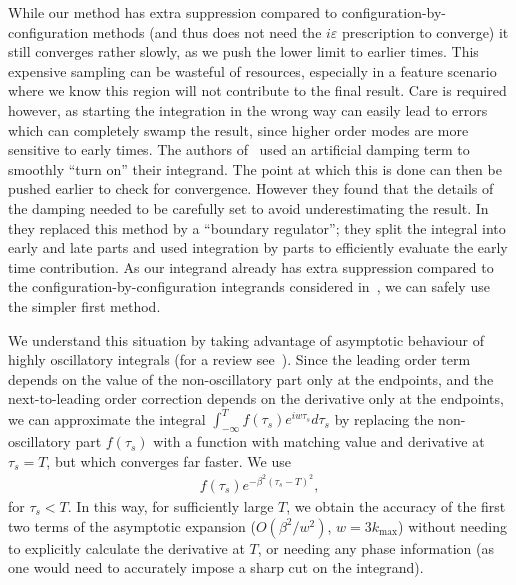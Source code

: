 \documentclass[a4paper,12pt]{extarticle}
\newcommand{\kmax}{{k_\text{max}}}
\begin{document}
While our method has extra suppression compared to configuration-by-configuration methods
(and thus does not need the $i\varepsilon$ prescription to converge)
it still converges rather slowly, as we push the lower limit to earlier times.
This expensive sampling can be wasteful of resources,
especially in a feature scenario where we know this
region will not contribute to the final result.
Care is required however, as starting the integration in the wrong way can easily lead to
errors which can completely swamp the result, since higher order modes
are more sensitive to early times.
The authors of~\cite{chen_easther_lim_1} used an artificial damping term to smoothly
``turn on'' their integrand.
The point at which this is done can then be pushed earlier to check for convergence.
However they found that the details of the damping needed to
be carefully set to avoid underestimating the result.
In~\cite{chen_easther_lim_2} they replaced this method by a ``boundary regulator'';
they split the integral into early and late parts and used integration by parts to
efficiently evaluate the early time contribution.
As our integrand already has extra suppression compared to the configuration-by-configuration
integrands considered in~\cite{chen_easther_lim_1,chen_easther_lim_2},
we can safely use the simpler first method.


We understand this situation by
taking advantage of asymptotic behaviour of highly oscillatory
integrals (for a review see~\cite{iserles_2005}).
Since the leading order term depends on
the value of the non-oscillatory part only at the endpoints,
and the next-to-leading order correction depends on the
derivative only at the endpoints, we can approximate the integral
$\int_{-\infty}^T f(\tau_s)e^{iw\tau_s}d\tau_s$
by replacing the non-oscillatory part $f(\tau_s)$ with a function with
matching value and derivative at $\tau_s=T$,
but which converges far faster.
We use
\begin{align}\label{smooth_cutoff}
f(\tau_s)e^{-\beta^2(\tau_s-T)^2},
\end{align}
for $\tau_s<T$.
In this way, for sufficiently large $T$,
we obtain the accuracy of the
first two terms of the asymptotic expansion
($O(\beta^2/w^2)$, $w=3\kmax$) without needing to explicitly
calculate the derivative at $T$, or needing any phase information (as
one would need to accurately impose a sharp cut on the integrand).
\end{document}
